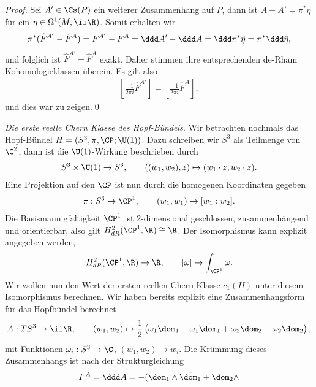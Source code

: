 \documentclass[%
	paper=a5,%
	fleqn,%
	DIV=18,%
	BCOR=0mm,
	fontsize=11pt,
	titlepage=false,%
	bibliography=totoc,
	DIV=18,%
	twoside=true,
	pdftitle=Riemannsche Geometrie,
	pdfauthor=Uwe Semmelmann,
	numbers=noendperiod]%
	{scrbook}
\begin{document}
\begin{proof}
Sei $A'\in\Cs(P)$ ein weiterer Zusammenhang auf $P$, dann ist
$A-A'=\pi^*\hat{\eta}$ für ein $\eta\in\Omega^1(M,\ii\R)$. Somit erhalten wir
\begin{align*}
\pi^*(\hat F^{A'}-\hat F^A) = F^{A'}-F^A = \ddd A' - \ddd A = \ddd
\pi^*\hat{\eta} = \pi^*\ddd\hat{\eta},
\end{align*}
und folglich ist $\hat F^{A'}-\hat F^A$ exakt. Daher stimmen ihre entsprechenden de-Rham
Kohomologieklassen überein. Es gilt also
\begin{align*}
\left[\frac{-1}{2\pi i} \hat{F}^{A'}\right] = 
\left[\frac{-1}{2\pi i} \hat{F}^{A}\right],
\end{align*}
und dies war zu zeigen.\qed
\end{proof}

\begin{ex}
\textit{Die erste reelle Chern Klasse des Hopf-Bündels}. Wir betrachten nochmals das Hopf-Bündel $H=(S^3,\pi,\CP;\U(1))$. 
Dazu schreiben wir $S^3$ als Teilmenge von $\C^2$, dann ist die $\U(1)$-Wirkung beschrieben durch
\begin{align*}
S^3\times \U(1)\to S^3,\qquad ((w_1,w_2),z)\mapsto (w_1 \cdot z,w_2\cdot z).
\end{align*}
Eine Projektion auf den $\CP$ ist nun durch die homogenen Koordinaten gegeben
\begin{align*}
\pi: S^3\to \CP^1,\qquad (w_1,w_1)\mapsto [w_1:w_2].
\end{align*}
Die Basismannigfaltigkeit $\CP^1$ ist 2-dimensional geschlossen,
zusammenhängend und orientierbar, also gilt $H_{dR}^2(\CP^1,\R)\cong\R$. Der
Isomorphismus kann explizit angegeben werden,
\begin{align*}
H_{dR}^2(\CP^1,\R)\to\R,\qquad [\omega]\mapsto \int_{\CP^1}\omega.
\end{align*}
Wir wollen nun den Wert der ersten reellen Chern Klasse $c_1(H)$ unter diesem
Isomorphismus berechnen. Wir haben bereits explizit eine Zusammenhangsform für
das Hopfbündel berechnet
\begin{align*}
A : TS^3\to \ii\R,\qquad (w_1,w_2) \mapsto 
\frac{1}{2}\left(\bar{\omega_1}\dom_1 - \omega_1\bar{\dom_1} +
\bar{\omega_2}\dom_2 - \omega_2\bar{\dom_2} \right),
\end{align*}
mit Funktionen $\omega_i : S^3\to \C$, $(w_1,w_2)\mapsto w_i$.
Die Krümmung dieses Zusammenhangs ist nach der Strukturgleichung
\begin{align*}
F^A = \ddd A = -(\dom_1\wedge \bar{\dom_1} + \dom_2\wedge

\end{align*}
\end{ex}
\end{document}
